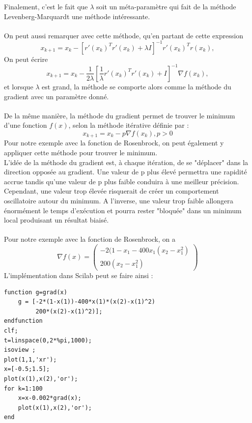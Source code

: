             Finalement, c'est le fait que $\lambda$ soit un méta-paramètre qui fait de la méthode Levenberg-Marquardt une méthode intéressante.
            \\\\
            On peut aussi remarquer avec cette méthode, qu'en partant de cette expression 
            $$
            x_{k+1} = x_k - [r'(x_k)^Tr'(x_k)+\lambda I]^{-1}r'(x_k)^Tr(x_k),
            $$
            On peut écrire
            $$
            x_{k+1} = x_k - \frac{1}{2\lambda}\left [\frac{1}{\lambda}r'(x_k)^Tr'(x_k)+I\right ]^{-1}\nabla f(x_k),
            $$
            et lorsque $\lambda$ est grand, la méthode se comporte alors comme la méthode du gradient avec un paramètre donné.\\\\
            De la même manière, la méthode du gradient permet de trouver le minimum d'une fonction $f(x)$, selon la méthode itérative définie par : 
            $$
            x_{k+1} = x_k - p\nabla f(x_k), p>0
            $$
            Pour notre exemple avec la fonction de Rosenbrock, on peut également y appliquer cette méthode pour trouver le minimum.\\ L'idée de la méthode du gradient est, à chaque itération, de se "déplacer" dans la direction opposée au gradient. Une valeur de p plus élevé permettra une rapidité accrue tandis qu'une valeur de p plus faible conduira à une meilleur précision. \\Cependant, une valeur trop élevée risquerait de créer un comportement oscillatoire autour du minimum. A l'inverse, une valeur trop faible allongera énormément le temps d'exécution et pourra rester "bloquée" dans un minimum local produisant un résultat biaisé.
            \\\\Pour notre exemple avec la fonction de Rosenbrock,
            on a 
            $$
            \nabla f(x) = \begin{pmatrix}
                -2(1-x_{1}-400x_1(x_2-x_1^2)\\
                200(x_2-x_1^2)
            \end{pmatrix}
            $$
            L'implémentation dans Scilab peut se faire ainsi :
            \begin{center}
          \begin{verbatim}
function g=grad(x)
    g = [-2*(1-x(1))-400*x(1)*(x(2)-x(1)^2)
         200*(x(2)-x(1)^2)];
endfunction
clf;
t=linspace(0,2*%pi,1000);
isoview ;
plot(1,1,'xr');
x=[-0.5;1.5];
plot(x(1),x(2),'or');
for k=1:100
    x=x-0.002*grad(x);
    plot(x(1),x(2),'or');
end
          \end{verbatim}
                \label{lst:code_13}
         \end{center}
